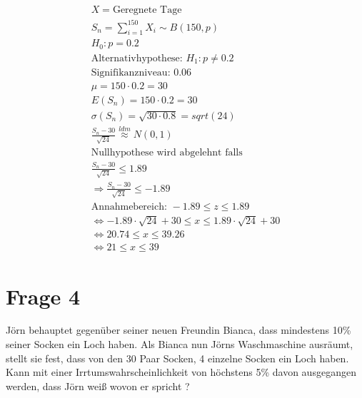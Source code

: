 \begin{align*}
    X = \text{Geregnete Tage}                                                        \\
    S_n = \sum_{i = 1}^{150}X_i \sim B(150, p)                                       \\
    H_0: p = 0.2                                                                     \\
    \text{Alternativhypothese: } H_1: p \neq 0.2                                     \\
    \text{Signifikanzniveau: } 0.06                                                  \\
    \mu = 150 \cdot 0.2 = 30                                                         \\
    E(S_n) = 150 \cdot 0.2 = 30                                                      \\
    \sigma(S_n) = \sqrt{30 \cdot 0.8} = sqrt(24)                                     \\
    \frac{S_n - 30}{\sqrt{24}} \overset{ldm}{\approx} N(0, 1)                        \\
    \text{Nullhypothese wird abgelehnt falls}                                        \\
    \frac{S_n - 30}{\sqrt{24}} \leq 1.89                                             \\
    \Rightarrow \frac{S_n - 30}{\sqrt{24}} \leq -1.89                                \\
    \text{Annahmebereich: } -1.89 \leq z \leq 1.89                                   \\
    \Leftrightarrow -1.89 \cdot \sqrt{24} + 30 \leq x \leq 1.89 \cdot \sqrt{24} + 30 \\
    \Leftrightarrow 20.74 \leq x \leq 39.26                                          \\
    \Leftrightarrow 21 \leq x \leq 39
\end{align*}

\section{Frage 4}
Jörn behauptet gegenüber seiner neuen Freundin Bianca, dass mindestens 10\%
seiner Socken ein Loch haben. Als Bianca nun Jörns Waschmaschine ausräumt,
stellt sie fest, dass von den 30 Paar Socken, 4 einzelne Socken ein Loch haben.
Kann mit einer Irrtumswahrscheinlichkeit von höchstens 5\% davon ausgegangen
werden, dass Jörn weiß wovon er spricht ?

